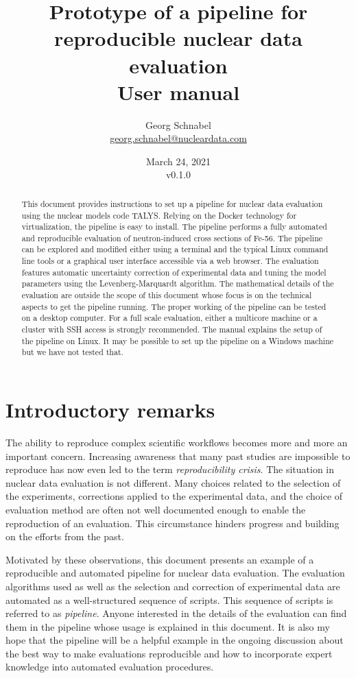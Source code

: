 \documentclass[12pt,a4paper]{scrartcl}
\title{\textbf{Prototype of a pipeline for reproducible nuclear data evaluation} \\[2ex] User manual}
\date{March 24, 2021\\v0.1.0}
\author{Georg Schnabel \\ \href{mailto:georg.schnabel@nucleardata.com}{georg.schnabel@nucleardata.com}}
\begin{document}
 \maketitle
 \begin{abstract}
This document provides instructions to set up a pipeline for nuclear data evaluation using the nuclear models code TALYS.
Relying on the Docker technology for virtualization, the pipeline is easy to install.
The pipeline performs a fully automated and reproducible evaluation of neutron-induced cross sections of Fe-56.
The pipeline can be explored and modified either using a terminal and the typical Linux command line tools or a graphical user interface accessible via a web browser.
The evaluation features automatic uncertainty correction of experimental data and tuning the model parameters using the Levenberg-Marquardt algorithm.
The mathematical details of the evaluation are outside the scope of this document whose focus is on the technical aspects to get the pipeline running.
The proper working of the pipeline can be tested on a desktop computer.
For a full scale evaluation, either a multicore machine or a cluster with SSH access is strongly recommended.
The manual explains the setup of the pipeline on Linux.
It may be possible to set up the pipeline on a Windows machine but we have not tested that.
 \end{abstract} 
 \newpage
 \tableofcontents
 \newpage 

 \section{Introductory remarks}
 The ability to reproduce complex scientific workflows becomes more and more an important concern.
 Increasing awareness that many past studies are impossible to reproduce has now even led to the term \textit{reproducibility crisis}.
 The situation in nuclear data evaluation is not different.
 Many choices related to the selection of the experiments, corrections applied to the experimental data, and the choice of evaluation method are often not well documented enough to enable the reproduction of an evaluation.
 This circumstance hinders progress and building on the efforts from the past.
 
 Motivated by these observations, this document presents an example of a reproducible and automated pipeline for nuclear data evaluation.
 The evaluation algorithms used as well as the selection and correction of experimental data are automated as a well-structured sequence of scripts.
 This sequence of scripts is referred to as \textit{pipeline}.
 Anyone interested in the details of the evaluation can find them in the pipeline whose usage is explained in this document.
 It is also my hope that the pipeline will be a helpful example in the ongoing discussion about the best way to make evaluations reproducible and how to incorporate expert knowledge into automated evaluation procedures.
 
\end{document}
